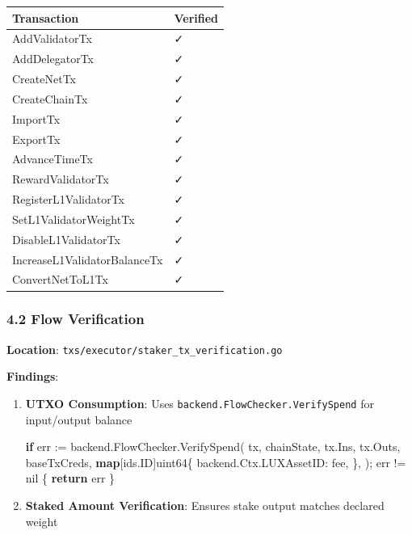\documentclass[
]{article}
\newenvironment{Shaded}{}{}
\newcommand{\ControlFlowTok}[1]{\textcolor[rgb]{0.00,0.44,0.13}{\textbf{#1}}}
\newcommand{\DataTypeTok}[1]{\textcolor[rgb]{0.56,0.13,0.00}{#1}}
\newcommand{\KeywordTok}[1]{\textcolor[rgb]{0.00,0.44,0.13}{\textbf{#1}}}
\newcommand{\NormalTok}[1]{#1}
\newcommand{\OperatorTok}[1]{\textcolor[rgb]{0.40,0.40,0.40}{#1}}
\newcommand{\OtherTok}[1]{\textcolor[rgb]{0.00,0.44,0.13}{#1}}
\newcounter{none} %
\begin{document}
{\def\LTcaptype{none} %
\begin{longtable}[]{@{}ll@{}}
\toprule\noalign{}
Transaction & Verified \\
\midrule\noalign{}
\endhead
\bottomrule\noalign{}
\endlastfoot
AddValidatorTx & ✓ \\
AddDelegatorTx & ✓ \\
CreateNetTx & ✓ \\
CreateChainTx & ✓ \\
ImportTx & ✓ \\
ExportTx & ✓ \\
AdvanceTimeTx & ✓ \\
RewardValidatorTx & ✓ \\
RegisterL1ValidatorTx & ✓ \\
SetL1ValidatorWeightTx & ✓ \\
DisableL1ValidatorTx & ✓ \\
IncreaseL1ValidatorBalanceTx & ✓ \\
ConvertNetToL1Tx & ✓ \\
\end{longtable}
}

\subsubsection{4.2 Flow Verification}\label{42-flow-verification}

\textbf{Location}: \texttt{txs/executor/staker\_tx\_verification.go}

\textbf{Findings}:

\begin{enumerate}
\def\labelenumi{\arabic{enumi}.}
\item
  \textbf{UTXO Consumption}: Uses
  \texttt{backend.FlowChecker.VerifySpend} for input/output balance

\begin{Shaded}
\begin{Highlighting}[]
\ControlFlowTok{if}\NormalTok{ err }\OperatorTok{:=}\NormalTok{ backend}\OperatorTok{.}\NormalTok{FlowChecker}\OperatorTok{.}\NormalTok{VerifySpend}\OperatorTok{(}
\NormalTok{    tx}\OperatorTok{,}
\NormalTok{    chainState}\OperatorTok{,}
\NormalTok{    tx}\OperatorTok{.}\NormalTok{Ins}\OperatorTok{,}
\NormalTok{    tx}\OperatorTok{.}\NormalTok{Outs}\OperatorTok{,}
\NormalTok{    baseTxCreds}\OperatorTok{,}
    \KeywordTok{map}\OperatorTok{[}\NormalTok{ids}\OperatorTok{.}\NormalTok{ID}\OperatorTok{]}\DataTypeTok{uint64}\OperatorTok{\{}
\NormalTok{        backend}\OperatorTok{.}\NormalTok{Ctx}\OperatorTok{.}\NormalTok{LUXAssetID}\OperatorTok{:}\NormalTok{ fee}\OperatorTok{,}
    \OperatorTok{\},}
\OperatorTok{);}\NormalTok{ err }\OperatorTok{!=} \OtherTok{nil} \OperatorTok{\{}
    \ControlFlowTok{return}\NormalTok{ err}
\OperatorTok{\}}
\end{Highlighting}
\end{Shaded}
\item
  \textbf{Staked Amount Verification}: Ensures stake output matches
  declared weight
\end{enumerate}
\end{document}
